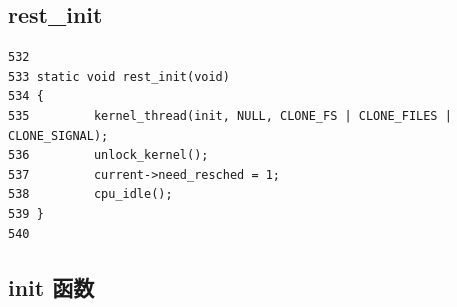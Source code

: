 \subsection{rest\_init}

{\begin{shaded}\begin{verbatim}
532 
533 static void rest_init(void)
534 {
535         kernel_thread(init, NULL, CLONE_FS | CLONE_FILES | CLONE_SIGNAL);
536         unlock_kernel();
537         current->need_resched = 1;
538         cpu_idle();
539 }
540 
\end{verbatim}\end{shaded}}
\subsection{init 函数}

